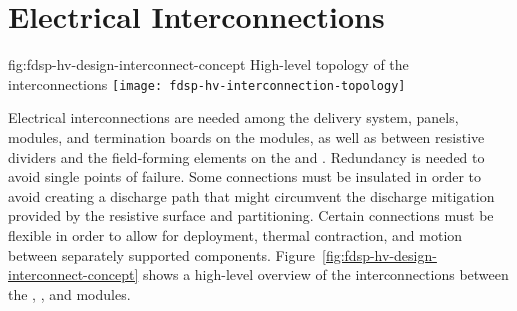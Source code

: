 \section{Electrical Interconnections} %
\label{sec:fdsp-hv-design-interconnect}

\begin{dunefigure}{fig:fdsp-hv-design-interconnect-concept}
  {High-level topology of the  interconnections}
  \texttt{[image: fdsp-hv-interconnection-topology]}
\end{dunefigure}
Electrical interconnections are needed among the  delivery system,  panels,  modules, and termination
boards on the  modules, as well as between resistive dividers and
the field-forming elements on the  and .  %
Redundancy is
needed to avoid single points of failure. 
Some connections must be
insulated in order to avoid creating a discharge path that might
circumvent the discharge mitigation provided by the resistive 
surface and  partitioning.  Certain connections must be
flexible in order to allow for  deployment, thermal
contraction, and motion between separately supported  components.  Figure~\ref{fig:fdsp-hv-design-interconnect-concept} shows a high-level
overview of the interconnections between the , , and  modules.


